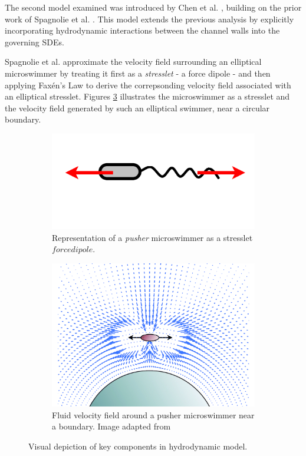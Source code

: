 The second model examined was introduced by Chen et al. \cite{chen2021shape}, 
building on the prior work of Spagnolie et al. 
\cite{spagnolie2015geometric}. This model extends the previous analysis by explicitly incorporating hydrodynamic
interactions between the channel walls into the governing SDEs.

Spagnolie et al. approximate the velocity field surrounding an elliptical microswimmer by treating it 
first as a \textit{stresslet} - a force dipole - and then applying Faxén's Law to derive the 
correpsonding velocity field associated with an elliptical stresslet. Figures \ref{fig:model_2_intro} 
illustrates the microswimmer as a stresslet and the velocity field generated by such an elliptical swimmer,
near a circular boundary.


\begin{figure}[htbp]
    \centering
    \begin{subfigure}[b]{0.45\textwidth}
        \centering
        \includegraphics[width=\textwidth]{graphics/pusher_pic.png}
        \caption{Representation of a \textit{pusher} microswimmer as a stresslet \(force dipole\).}
        \label{fig:pusher_chart}
    \end{subfigure}
    \hfill
    \begin{subfigure}[b]{0.45\textwidth}
        \centering
        \includegraphics[width=\textwidth]{graphics/fluid_field_model2.pdf}
        \caption{Fluid velocity field around a pusher microswimmer near a boundary. Image
        adapted from \cite{spagnolie2015geometric}}
        \label{fig:fluid_field_pusher}
    \end{subfigure}
    \caption{Visual depiction of key components in hydrodynamic model.}
    \label{fig:model_2_intro}
\end{figure}

